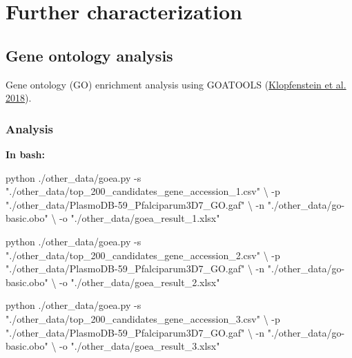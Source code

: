 \documentclass[
  11pt,
  oneside]{book}
\newenvironment{Shaded}{\begin{snugshade}}{\end{snugshade}}
\newcommand{\AttributeTok}[1]{\textcolor[rgb]{0.77,0.63,0.00}{#1}}
\newcommand{\DataTypeTok}[1]{\textcolor[rgb]{0.13,0.29,0.53}{#1}}
\newcommand{\ExtensionTok}[1]{#1}
\newcommand{\NormalTok}[1]{#1}
\newcommand{\StringTok}[1]{\textcolor[rgb]{0.31,0.60,0.02}{#1}}
\begin{document}
\hypertarget{05_further_characterization}{%
\chapter{Further characterization}\label{05_further_characterization}}

\hypertarget{gene-ontology-analysis}{%
\section{Gene ontology analysis}\label{gene-ontology-analysis}}

Gene ontology (GO) enrichment analysis using GOATOOLS (\protect\hyperlink{ref-Klopfenstein:2018vj}{Klopfenstein et al. 2018}).

\hypertarget{analysis-7}{%
\subsection{Analysis}\label{analysis-7}}

\textbf{In bash: }

\begin{Shaded}
\begin{Highlighting}[]
\ExtensionTok{python}\NormalTok{ ./other\_data/goea.py }\AttributeTok{{-}s} \StringTok{"./other\_data/top\_200\_candidates\_gene\_accession\_1.csv"} \DataTypeTok{\textbackslash{}}
                            \AttributeTok{{-}p} \StringTok{"./other\_data/PlasmoDB{-}59\_Pfalciparum3D7\_GO.gaf"} \DataTypeTok{\textbackslash{}}
                            \AttributeTok{{-}n} \StringTok{"./other\_data/go{-}basic.obo"} \DataTypeTok{\textbackslash{}}
                            \AttributeTok{{-}o} \StringTok{"./other\_data/goea\_result\_1.xlsx"}
                            
\ExtensionTok{python}\NormalTok{ ./other\_data/goea.py }\AttributeTok{{-}s} \StringTok{"./other\_data/top\_200\_candidates\_gene\_accession\_2.csv"} \DataTypeTok{\textbackslash{}}
                            \AttributeTok{{-}p} \StringTok{"./other\_data/PlasmoDB{-}59\_Pfalciparum3D7\_GO.gaf"} \DataTypeTok{\textbackslash{}}
                            \AttributeTok{{-}n} \StringTok{"./other\_data/go{-}basic.obo"} \DataTypeTok{\textbackslash{}}
                            \AttributeTok{{-}o} \StringTok{"./other\_data/goea\_result\_2.xlsx"}
                            
\ExtensionTok{python}\NormalTok{ ./other\_data/goea.py }\AttributeTok{{-}s} \StringTok{"./other\_data/top\_200\_candidates\_gene\_accession\_3.csv"} \DataTypeTok{\textbackslash{}}
                            \AttributeTok{{-}p} \StringTok{"./other\_data/PlasmoDB{-}59\_Pfalciparum3D7\_GO.gaf"} \DataTypeTok{\textbackslash{}}
                            \AttributeTok{{-}n} \StringTok{"./other\_data/go{-}basic.obo"} \DataTypeTok{\textbackslash{}}
                            \AttributeTok{{-}o} \StringTok{"./other\_data/goea\_result\_3.xlsx"}
\end{Highlighting}
\end{Shaded}
\end{document}
